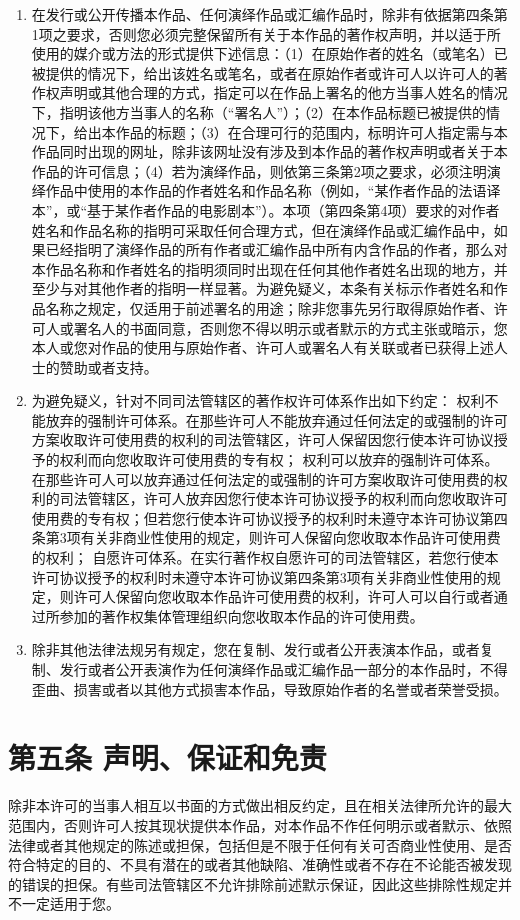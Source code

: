 \begin{enumerate}
	\item 在发行或公开传播本作品、任何演绎作品或汇编作品时，除非有依据第四条第1项之要求，否则您必须完整保留所有关于本作品的著作权声明，并以适于所使用的媒介或方法的形式提供下述信息：（1）在原始作者的姓名（或笔名）已被提供的情况下，给出该姓名或笔名，或者在原始作者或许可人以许可人的著作权声明或其他合理的方式，指定可以在作品上署名的他方当事人姓名的情况下，指明该他方当事人的名称（“署名人”）；（2）在本作品标题已被提供的情况下，给出本作品的标题；（3）在合理可行的范围内，标明许可人指定需与本作品同时出现的网址，除非该网址没有涉及到本作品的著作权声明或者关于本作品的许可信息；（4）若为演绎作品，则依第三条第2项之要求，必须注明演绎作品中使用的本作品的作者姓名和作品名称（例如，“某作者作品的法语译本”，或“基于某作者作品的电影剧本”）。本项（第四条第4项）要求的对作者姓名和作品名称的指明可采取任何合理方式，但在演绎作品或汇编作品中，如果已经指明了演绎作品的所有作者或汇编作品中所有内含作品的作者，那么对本作品名称和作者姓名的指明须同时出现在任何其他作者姓名出现的地方，并至少与对其他作者的指明一样显著。为避免疑义，本条有关标示作者姓名和作品名称之规定，仅适用于前述署名的用途；除非您事先另行取得原始作者、许可人或署名人的书面同意，否则您不得以明示或者默示的方式主张或暗示，您本人或您对作品的使用与原始作者、许可人或署名人有关联或者已获得上述人士的赞助或者支持。
	\item 为避免疑义，针对不同司法管辖区的著作权许可体系作出如下约定：
	\subitem 权利不能放弃的强制许可体系。在那些许可人不能放弃通过任何法定的或强制的许可方案收取许可使用费的权利的司法管辖区，许可人保留因您行使本许可协议授予的权利而向您收取许可使用费的专有权；
	\subitem 权利可以放弃的强制许可体系。在那些许可人可以放弃通过任何法定的或强制的许可方案收取许可使用费的权利的司法管辖区，许可人放弃因您行使本许可协议授予的权利而向您收取许可使用费的专有权；但若您行使本许可协议授予的权利时未遵守本许可协议第四条第3项有关非商业性使用的规定，则许可人保留向您收取本作品许可使用费的权利；
	\subitem 自愿许可体系。在实行著作权自愿许可的司法管辖区，若您行使本许可协议授予的权利时未遵守本许可协议第四条第3项有关非商业性使用的规定，则许可人保留向您收取本作品许可使用费的权利，许可人可以自行或者通过所参加的著作权集体管理组织向您收取本作品的许可使用费。
	\item 除非其他法律法规另有规定，您在复制、发行或者公开表演本作品，或者复制、发行或者公开表演作为任何演绎作品或汇编作品一部分的本作品时，不得歪曲、损害或者以其他方式损害本作品，导致原始作者的名誉或者荣誉受损。
\end{enumerate}
\section{第五条 声明、保证和免责}
除非本许可的当事人相互以书面的方式做出相反约定，且在相关法律所允许的最大范围内，否则许可人按其现状提供本作品，对本作品不作任何明示或者默示、依照法律或者其他规定的陈述或担保，包括但是不限于任何有关可否商业性使用、是否符合特定的目的、不具有潜在的或者其他缺陷、准确性或者不存在不论能否被发现的错误的担保。有些司法管辖区不允许排除前述默示保证，因此这些排除性规定并不一定适用于您。
